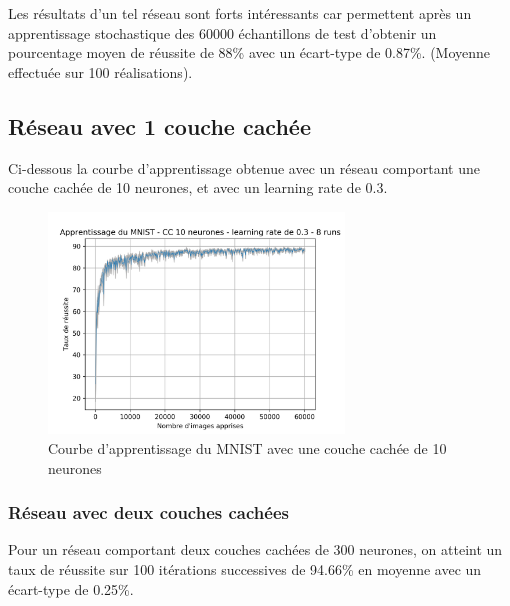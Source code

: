 \medskip

Les résultats d'un tel réseau sont forts intéressants car permettent après un
apprentissage stochastique des 60000 échantillons de test d'obtenir un
pourcentage moyen de réussite de 88\% avec un écart-type de 0.87\%.
(Moyenne effectuée sur 100 réalisations).

\subsection{Réseau avec 1 couche cachée}

Ci-dessous la courbe d'apprentissage obtenue avec un réseau comportant une couche
cachée de 10 neurones, et avec un learning rate de 0.3.

\begin{figure}[!ht]
\begin{center}
  \includegraphics[width=0.7\textwidth]{images/mnist-256-10-03.png}
\end{center}
\caption{Courbe d'apprentissage du MNIST avec une couche cachée de 10 neurones}
\end{figure}

\subsubsection{Réseau avec deux couches cachées}

Pour un réseau comportant deux couches cachées de 300 neurones, on atteint un taux
de réussite sur 100 itérations successives de 94.66\% en moyenne avec un écart-type de 0.25\%.
